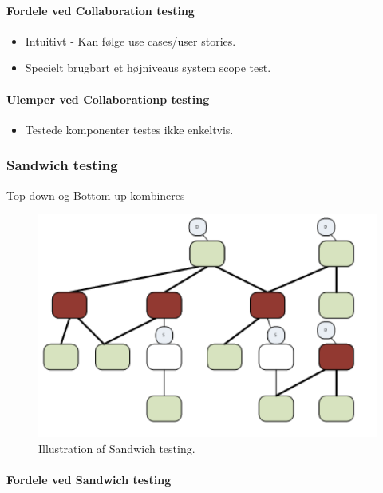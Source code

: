\paragraph{Fordele ved Collaboration testing}

\begin{itemize}
	\item Intuitivt - Kan følge use cases/user stories.
	\item Specielt brugbart et højniveaus system scope test.
\end{itemize}

\paragraph{Ulemper ved Collaborationp testing}

\begin{itemize}
	\item Testede komponenter testes ikke enkeltvis.
\end{itemize}


\subsubsection{Sandwich testing}

Top-down og Bottom-up kombineres

\begin{figure}
\centering
\includegraphics[width=0.7\linewidth]{figs/sandwich.PNG}
\caption{Illustration af Sandwich testing.}
\label{fig:sandwich}
\end{figure}

\paragraph{Fordele ved Sandwich testing}

